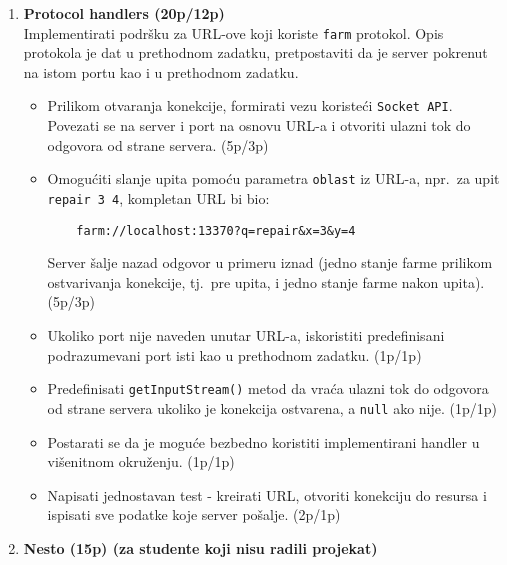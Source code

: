 \documentclass[]{article}
\begin{document}
\begin{enumerate}
\item \textbf{Protocol handlers (20p/12p)}
\\Implementirati podr\v{s}ku za URL-ove koji koriste \texttt{farm} protokol. Opis protokola je dat u prethodnom zadatku, pretpostaviti da je server pokrenut na istom portu kao i u prethodnom zadatku. 
\begin{itemize}
  \item Prilikom otvaranja konekcije, formirati vezu koriste\'c{}i \texttt{Socket API}. Povezati se na server i port na osnovu URL-a i otvoriti ulazni tok do odgovora od strane servera. \hfill (5p/3p)
  \item Omogu\'c{}iti slanje upita pomo\'c{}u parametra \texttt{oblast} iz URL-a, npr.~za upit \texttt{repair 3 4}, kompletan URL bi bio:
  \begin{lstlisting}
    farm://localhost:13370?q=repair&x=3&y=4
  \end{lstlisting}
  Server \v{s}alje nazad odgovor u primeru iznad (jedno stanje farme prilikom ostvarivanja konekcije, tj.~pre upita, i jedno stanje farme nakon upita). \hfill (5p/3p)
  \item Ukoliko port nije naveden unutar URL-a, iskoristiti predefinisani podrazumevani port isti kao u prethodnom zadatku. \hfill (1p/1p)
  \item Predefinisati \texttt{getInputStream()} metod da vra\'c{}a ulazni tok do odgovora od strane servera ukoliko je konekcija ostvarena, a \texttt{null} ako nije. \hfill (1p/1p)
  \item Postarati se da je mogu\'c{}e bezbedno koristiti implementirani handler u vi\v{s}enitnom okru\v{z}enju. \hfill (1p/1p)
  \item Napisati jednostavan test - kreirati URL, otvoriti konekciju do resursa i ispisati sve podatke koje server po\v{s}alje. \hfill (2p/1p)
\end{itemize}

\vspace{15pt}

\item \textbf{Nesto (15p) (za studente koji nisu radili projekat)}


\end{enumerate}
\end{document}
